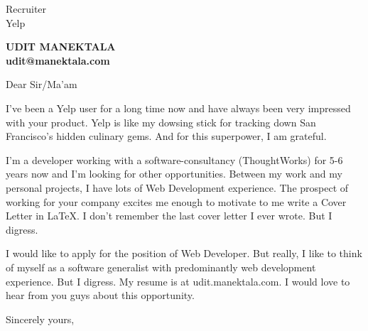 \documentclass[11pt]{letter} %
\begin{document}
\signature{Udit Manektala}                  %
\longindentation=0pt                       %
\let\raggedleft\raggedright                %
 
\begin{letter}{Recruiter\\
Yelp} 

\begin{center}
\large\bf UDIT MANEKTALA\\
udit@manektala.com\\
\end{center} 
\vfill %


 
\opening{Dear Sir/Ma'am} 
 
\noindent I've been a Yelp user for a long time now and have always been very impressed with your product. Yelp is like my dowsing stick for tracking down San Francisco's hidden culinary gems. And for this superpower, I am grateful.

 I'm a developer working with a software-consultancy (ThoughtWorks) for 5-6 years now and I'm looking for other opportunities. Between my work and my personal projects, I have lots of Web Development experience. The prospect of working for your company excites me enough to motivate to me write a Cover Letter in LaTeX. I don't remember the last cover letter I ever wrote. But I digress. 

I would like to apply for the position of Web Developer. But really, I like to think of myself as a software generalist with predominantly web development experience. But I digress. My resume is at udit.manektala.com. I would love to hear from you guys about this opportunity.
 
\closing{Sincerely yours,}
 
 

\end{letter}
 
\end{document}
